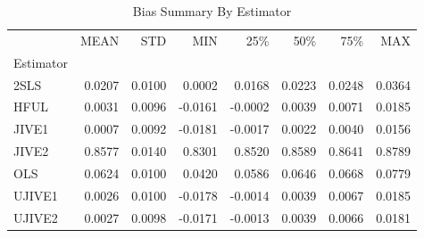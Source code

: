 \begin{table}[ht]
\centering
\caption{Bias Summary By Estimator}
\begin{tabular}{lrrrrrrr}
\toprule
 & MEAN & STD & MIN & 25\% & 50\% & 75\% & MAX \\
Estimator &  &  &  &  &  &  &  \\
\midrule
2SLS & 0.0207 & 0.0100 & 0.0002 & 0.0168 & 0.0223 & 0.0248 & 0.0364 \\
HFUL & 0.0031 & 0.0096 & -0.0161 & -0.0002 & 0.0039 & 0.0071 & 0.0185 \\
JIVE1 & 0.0007 & 0.0092 & -0.0181 & -0.0017 & 0.0022 & 0.0040 & 0.0156 \\
JIVE2 & 0.8577 & 0.0140 & 0.8301 & 0.8520 & 0.8589 & 0.8641 & 0.8789 \\
OLS & 0.0624 & 0.0100 & 0.0420 & 0.0586 & 0.0646 & 0.0668 & 0.0779 \\
UJIVE1 & 0.0026 & 0.0100 & -0.0178 & -0.0014 & 0.0039 & 0.0067 & 0.0185 \\
UJIVE2 & 0.0027 & 0.0098 & -0.0171 & -0.0013 & 0.0039 & 0.0066 & 0.0181 \\
\bottomrule
\end{tabular}
\end{table}
